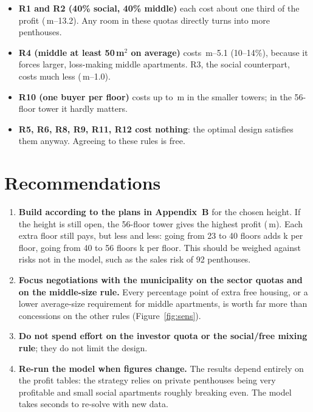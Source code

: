\documentclass[11pt,a4paper]{article}
\newcommand{\M}[1]{\EUR{#1}\,m}
\begin{document}
\begin{itemize}[leftmargin=*]
\item \textbf{R1 and R2 (40\% social, 40\% middle)} each cost about one third of
  the profit (\M{5.0}--13.2). Any room in these quotas directly turns
  into more penthouses.
\item \textbf{R4 (middle at least 50\,m$^2$ on average)} costs \M{1.7}--5.1
  (10--14\%), because it forces larger, loss-making middle apartments. R3, the
  social counterpart, costs much less (\M{0.4}--1.0).
\item \textbf{R10 (one buyer per floor)} costs up to \M{0.9} in the
  smaller towers; in the 56-floor tower it hardly matters.
\item \textbf{R5, R6, R8, R9, R11, R12 cost nothing}: the optimal design
  satisfies them anyway. Agreeing to these rules is free.
\end{itemize}

\section{Recommendations}

\begin{enumerate}[leftmargin=*]
\item \textbf{Build according to the plans in Appendix~B} for the chosen
  height. If the height is still open, the 56-floor tower gives the highest
  profit (\M{39.2}). Each extra floor still pays, but less and less: going from
  23 to 40 floors adds k per floor, going from 40 to 56 floors
  k per floor. This should be weighed against risks not in the
  model, such as the sales risk of 92 penthouses.
\item \textbf{Focus negotiations with the municipality on the sector quotas
  and on the middle-size rule.} Every percentage point of extra free housing,
  or a lower average-size requirement for middle apartments, is worth far more
  than concessions on the other rules (Figure~\ref{fig:sens}).
\item \textbf{Do not spend effort on the investor quota or the
  social/free mixing rule}; they do not limit the design.
\item \textbf{Re-run the model when figures change.} The results depend
  entirely on the profit tables: the strategy relies on private penthouses
  being very profitable and small social apartments roughly breaking even. The
  model takes seconds to re-solve with new data.
\end{enumerate}
\end{document}
